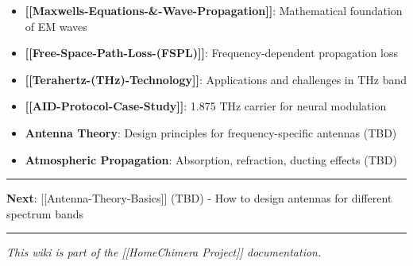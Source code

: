 \begin{itemize}
\tightlist
\item
  \textbf{{[}{[}Maxwell\textquotesingle s-Equations-\&-Wave-Propagation{]}{]}}:
  Mathematical foundation of EM waves
\item
  \textbf{{[}{[}Free-Space-Path-Loss-(FSPL){]}{]}}: Frequency-dependent
  propagation loss
\item
  \textbf{{[}{[}Terahertz-(THz)-Technology{]}{]}}: Applications and
  challenges in THz band
\item
  \textbf{{[}{[}AID-Protocol-Case-Study{]}{]}}: 1.875 THz carrier for
  neural modulation
\item
  \textbf{Antenna Theory}: Design principles for frequency-specific
  antennas (TBD)
\item
  \textbf{Atmospheric Propagation}: Absorption, refraction, ducting
  effects (TBD)
\end{itemize}

\begin{center}\rule{0.5\linewidth}{0.5pt}\end{center}

\textbf{Next}: {[}{[}Antenna-Theory-Basics{]}{]} (TBD) - How to design
antennas for different spectrum bands

\begin{center}\rule{0.5\linewidth}{0.5pt}\end{center}

\emph{This wiki is part of the {[}{[}Home\textbar Chimera Project{]}{]}
documentation.}
